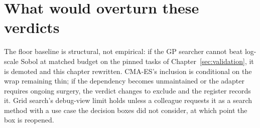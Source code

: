 \section{What would overturn these verdicts}

The floor baseline is structural, not empirical: if the GP searcher
cannot beat log-scale Sobol at matched budget on the pinned tasks of
Chapter~\ref{sec:validation}, it is demoted and this chapter
rewritten. CMA-ES's inclusion is conditional on the wrap remaining
thin; if the dependency becomes unmaintained or the adapter requires
ongoing surgery, the verdict changes to exclude and the register
records it. Grid search's debug-view limit holds unless a colleague
requests it as a search method with a use case the decision boxes
did not consider, at which point the box is reopened.
